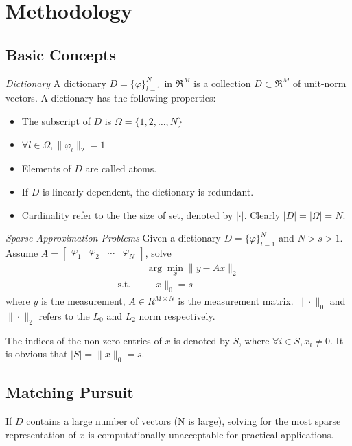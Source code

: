 \documentclass{ucsdreport}
\begin{document}
\section{Methodology}
\subsection{Basic Concepts}

\begin{definition}{\textit{Dictionary}}
A dictionary $D=\{\varphi\}^N_{l=1}$ in $\Re ^M$ is a collection $D \subset \Re^M$ of unit-norm vectors. A dictionary has the following properties:
\begin{itemize}
    \item The subscript of $D$ is $\Omega=\{1,2,\dots,N\}$
    \item $\forall l\in \Omega, \|\varphi_l\|_2 = 1$
    \item Elements of $D$ are called atoms.
    \item If $D$ is linearly dependent, the dictionary is redundant.
    \item Cardinality refer to the the size of set, denoted by $|\cdot|$. Clearly $|D|=|\Omega|=N$.
\end{itemize}
\end{definition}

\begin{definition}{\textit{Sparse Approximation Problems}}
Given a dictionary $D=\{\varphi\}^N_{l=1}$ and $N>s>1$. Assume $A=\begin{bmatrix}\varphi_1&\varphi_2&\dots&\varphi_N\end{bmatrix}$, solve
\begin{equation}
    \begin{aligned}
     & & \arg\min_x \|y-Ax\|_2 \\
     \text{s.t.} & & \|x\|_0=s
    \end{aligned}
\end{equation}
where $y$ is the measurement, $A \in R^{M\times N} $ is the measurement matrix. $\|\cdot\|_0$ and $\|\cdot\|_2$ refers to the $L_0$ and $L_2$ norm respectively.

The indices of the non-zero entries of $x$ is denoted by $S$, where $\forall i \in S, x_{i} \ne 0$. It is obvious that $|S|=\|x\|_0=s$.
\end{definition}

\subsection{Matching Pursuit}
If $D$ contains a large number of vectors (N is large), solving for the most sparse representation of $x$ is computationally unacceptable for practical applications.
\end{document}
